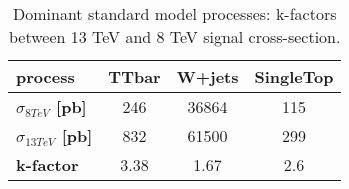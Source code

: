 \documentclass[10pt]{article}
\begin{document}
\begin{table}[!ht]
\begin{center}
\begin{tabular}{|l|c|c|c|}
\hline
\hline
\textbf{ process}                  & \textbf{TTbar} & \textbf{W+jets} & \textbf{SingleTop} \\
\hline
\textbf{ $\sigma_{ 8  TeV}$ [pb]}  & 246            & 36864           & 115         \\
\textbf{ $\sigma_{ 13 TeV}$ [pb]}  & 832            & 61500           & 299         \\
\hline                                                                    
\textbf{ k-factor}                 & 3.38           & 1.67            & 2.6         \\
\hline                                                                     
\hline                                                                     
\hline
\end{tabular}
\caption{Dominant standard model processes: k-factors between 13 TeV and 8 TeV signal cross-section.}
\label{tab:SFtable}
\end{center}
\end{table} 
\end{document}
